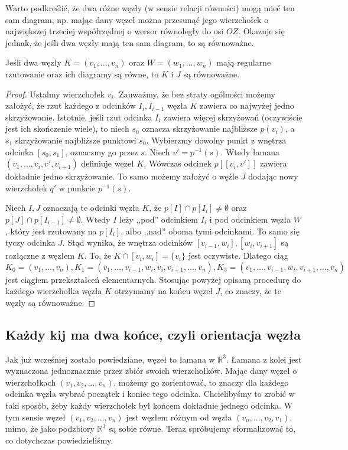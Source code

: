  
Warto podkreślić, że dwa różne węzły (w sensie relacji równości) mogą mieć ten sam diagram, np. mając dany węzeł można przesunąć jego wierzchołek o największej trzeciej współrzędnej
o wersor równoległy do osi $OZ$. Okazuje się jednak, że jeśli dwa węzły mają ten sam diagram, to są równoważne.
 
 
\begin{twierdzenie}
 Jeśli dwa węzły $K = (v_1,\ldots, v_n)$ oraz $W = (w_1, \ldots, w_n)$ mają regularne rzutowanie oraz ich diagramy są równe, to $K$ i $J$ są równoważne.
\end{twierdzenie}
\begin{proof}
 Ustalmy wierzchołek $v_i$. Zauważmy, że bez straty ogólności możemy założyć, że rzut każdego z odcinków $I_i, I_{i-1}$ węzła $K$ zawiera co najwyżej jedno skrzyżowanie.
 Istotnie, jeśli
 rzut odcinka $I_i$ zawiera więcej skrzyżowań (oczywiście jest ich skończenie wiele), to niech $s_0$ oznacza skrzyżowanie najbliższe $p(v_i)$, a $s_1$ skrzyżowanie najbliższe
 punktowi $s_0$. Wybierzmy dowolny punkt z wnętrza odcinka $[s_0, s_1]$, oznaczmy go przez $s$. Niech $v' = p^{-1}(s)$. Wtedy łamana $(v_1, \ldots, v_i, v', v_{i+1})$ definiuje
 węzeł $K$. Wówczas odcinek $p[ [v_i, v']]$ zawiera dokładnie jedno skrzyżowanie. To samo możemy założyć o węźle $J$ dodając nowy wierzchołek $q'$ w punkcie $p^{-1}(s)$.
 
 Niech $I, J$ oznaczają te odcinki węzła $K$, że $p[I]\cap p[I_i]\neq\emptyset$ oraz $p[J]\cap p[I_{i-1}]\neq\emptyset$. Wtedy $I$ leży ,,pod'' odcinkiem $I_i$ i pod odcinkiem
 węzła $W$, który jest rzutowany na $p[I_i]$, albo ,,nad'' oboma tymi odcinkami. To samo się tyczy odcinka $J$. Stąd wynika, że wnętrza odcinków $[v_{i-1}, w_i], [w_i, v_{i+1}]$ są
 rozłączne z węzłem $K$. To, że $K\cap [v_i,w_i] = \lbrace v_i\rbrace$ jest oczywiste. Dlatego ciąg
 \begin{displaymath}
  K_0 = (v_1, \ldots, v_n), K_1 = (v_1, \ldots, v_{i-1}, w_i, v_i, v_{i+1}, \ldots, v_n), K_3 = (v_1, \ldots, v_{i-1}, w_i, v_{i+1}, \ldots, v_n)
 \end{displaymath}
jest ciągiem przekształceń elementarnych. Stosując powyżej opisaną procedurę do każdego wierzchołka węzła $K$ otrzymamy na końcu węzeł $J$, co znaczy, że te węzły są równoważne.
 
 \end{proof}
 
\subsection{Każdy kij ma dwa końce, czyli orientacja węzła}
Jak już wcześniej zostało powiedziane, węzeł to łamana w $\mathbb{R}^3$. Łamana z kolei jest wyznaczona jednoznacznie przez zbiór  swoich wierzchołków. Mając dany węzeł o wierzchołkach
$(v_1, v_2, \ldots, v_n)$, możemy go zorientować, to znaczy dla każdego odcinka węzła wybrać początek i koniec tego odcinka. Chcielibyśmy to zrobić w taki sposób, żeby każdy wierzchołek
był końcem dokładnie jednego odcinka. W tym sensie węzeł $(v_1, v_2, \ldots, v_n)$ jest węzłem różnym od węzła $(v_n, \ldots, v_2, v_1)$, mimo, że jako podzbiory $\mathbb{R}^3$ są
sobie równe. Teraz spróbujemy sformalizować to, co dotychczas powiedzieliśmy.
 
